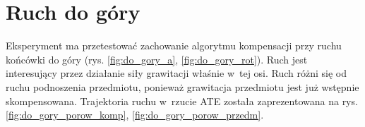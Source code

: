 

\section{Ruch do góry}

Eksperyment ma przetestować zachowanie algorytmu kompensacji przy ruchu końcówki do góry (rys. \ref{fig:do_gory_a}, \ref{fig:do_gory_rot}).  Ruch jest interesujący przez działanie siły grawitacji właśnie w~tej osi. Ruch różni się od ruchu podnoszenia przedmiotu, ponieważ grawitacja przedmiotu jest już wstępnie skompensowana. Trajektoria ruchu w~rzucie ATE została zaprezentowana na rys. \ref{fig:do_gory_porow_komp}, \ref{fig:do_gory_porow_przedm}.

